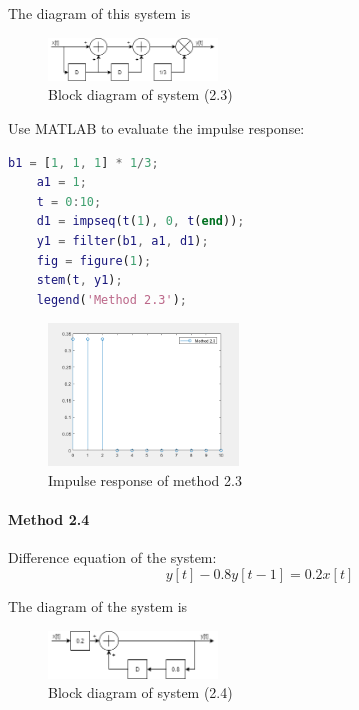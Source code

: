 \documentclass[conference]{IEEEtran}
\begin{document}
The diagram of this system is
\begin{figure}[htpb]
	\begin{center}
		\includegraphics[width=0.4\textwidth]{222-1.png}
		\caption{Block diagram of system (2.3)}
		\label{fig:5}
	\end{center}
\end{figure}

Use MATLAB to evaluate the impulse response:
\begin{lstlisting}[language=matlab,style=matlab]
	b1 = [1, 1, 1] * 1/3;
	a1 = 1;
	t = 0:10;
	d1 = impseq(t(1), 0, t(end));
	y1 = filter(b1, a1, d1);
	fig = figure(1);
	stem(t, y1);
	legend('Method 2.3');
\end{lstlisting}
\begin{figure}[htpb]
	\begin{center}
		\includegraphics[width=0.45\textwidth]{../matlab/q222_1.png}
		\caption{Impulse response of method 2.3}
		\label{fig:6}
	\end{center}
\end{figure}
\pagebreak
\paragraph{Method 2.4}
Difference equation of the system:
\begin{equation}
	y[t]-0.8y[t-1]=0.2x[t]
\end{equation}

The diagram of the system is
\begin{figure}[htpb]
	\begin{center}
		\includegraphics[width=0.4\textwidth]{222-2.png}
		\caption{Block diagram of system (2.4)}
		\label{fig:7}
	\end{center}
\end{figure}
\end{document}
